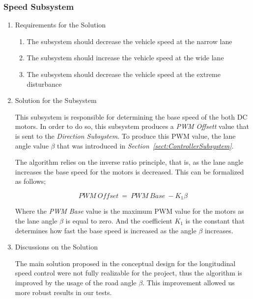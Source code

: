 \documentclass[a4paper,12pt]{article}
\begin{document}
\subsubsection{Speed Subsystem}


\begin{enumerate}

\item {Requirements for the Solution}


\begin{enumerate}

\item The subsystem should decrease the vehicle speed at the narrow lane 

\item The subsystem should increase the vehicle speed at the wide lane

\item The subsystem should decrease the vehicle speed at the extreme disturbance  

\end{enumerate}


\item {Solution for the Subsystem}


This subsystem is responsible for determining the base speed of the both DC motors. In order to do so, this subsystem produces a \textit{PWM Offsett} value that is sent to the \textit{Direction Subsystem}. To produce this PWM value, the lane angle value $\beta$ that was introduced in \textit{Section~\ref{sect:ControllerSubsystem}}.


The algorithm relies on the inverse ratio principle, that is, as the lane angle increases the base speed for the motors is decreased. This can be formalized as follows;


$$ PWM~Offset~=~PWM~Base~-K_1 \beta$$


Where the \textit{PWM Base} value is the maximum PWM value for the motors as the lane angle $\beta$ is equal to zero. And the coefficient $K_1$ is the constant that determines how fast the base speed is increased as the angle $\beta$ increases.



\item {Discussions on the Solution}


The main solution proposed in the conceptual design for the longitudinal speed control were not fully realizable for the project, thus the algorithm is improved by the usage of the road angle $\beta$. This improvement allowed us more robust results in our tests.


\end{enumerate}
\end{document}
